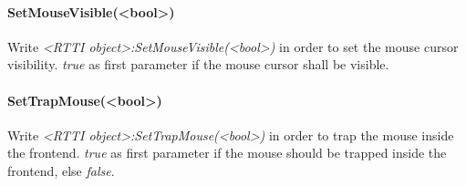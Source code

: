 \paragraph{SetMouseVisible(<bool>)}
Write \emph{<RTTI object>:SetMouseVisible(<bool>)} in order to set the mouse cursor visibility. \emph{true} as first parameter if the mouse cursor shall be visible.

\paragraph{SetTrapMouse(<bool>)}
Write \emph{<RTTI object>:SetTrapMouse(<bool>)} in order to trap the mouse inside the frontend. \emph{true} as first parameter if the mouse should be trapped inside the frontend, else \emph{false}.
